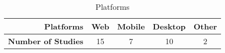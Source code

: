 \begin{table}
	\caption{Platforms} 
	\centering
	\fontsize{8pt}{9pt}\selectfont
	\setlength\tabcolsep{4px}
	\begin{threeparttable}
		\bgroup
		\begin{tabular}{r c c c c}
			\toprule
			        \textbf{Platforms} & \textbf{Web} & \textbf{Mobile} & \textbf{Desktop} & \textbf{Other} \\ \toprule
			\textbf{Number of Studies} & 15           & 7               & 10               & 2              \\ \bottomrule
		\end{tabular}
		\egroup
	\end{threeparttable}
	\label{table:platforms}
\end{table}
